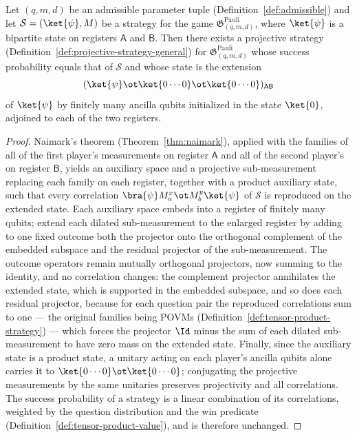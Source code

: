 \begin{lemma}
	\label{lem:projective-strategy-setup}
	\leanok
	Let $(q,m,d)$ be an admissible parameter tuple
	(Definition~\ref{def:admissible}) and let
	$\mathcal{S} = (\ket{\psi}, M)$ be a strategy for the game
	$\mathfrak{G}^{\mathrm{Pauli}}_{(q,m,d)}$, where $\ket{\psi}$ is a
	bipartite state on registers $\mathsf{A}$ and $\mathsf{B}$. Then there
	exists a projective strategy
	(Definition~\ref{def:projective-strategy-general}) for
	$\mathfrak{G}^{\mathrm{Pauli}}_{(q,m,d)}$ whose success probability
	equals that of $\mathcal{S}$ and whose state is the extension
	\[
		(\ket{\psi} \ot \ket{0\cdots 0} \ot \ket{0\cdots 0})_{\mathsf{A}\mathsf{B}}
	\]
	of $\ket{\psi}$ by finitely many ancilla qubits initialized in the
	state $\ket{0}$, adjoined to each of the two registers.
\end{lemma}
\begin{proof}
	\leanok
	Naimark's theorem (Theorem~\ref{thm:naimark}), applied with the
	families of all of the first player's measurements on register
	$\mathsf{A}$ and all of the second player's on register $\mathsf{B}$,
	yields an auxiliary space and a projective sub-measurement replacing
	each family on each register, together with a product auxiliary state,
	such that every correlation
	$\bra{\psi} M^{x}_a \ot M^{y}_b \ket{\psi}$ of $\mathcal{S}$ is
	reproduced on the extended state. Each auxiliary space embeds into a
	register of finitely many qubits; extend each dilated sub-measurement
	to the enlarged register by adding to one fixed outcome both the
	projector onto the orthogonal complement of the embedded subspace and
	the residual projector of the sub-measurement. The outcome operators
	remain mutually orthogonal projectors, now summing to the identity,
	and no correlation changes: the complement projector annihilates the
	extended state, which is supported in the embedded subspace, and so
	does each residual projector, because for each question pair the
	reproduced correlations sum to one --- the original families being
	POVMs (Definition~\ref{def:tensor-product-strategy}) --- which forces
	the projector $\Id$ minus the sum of each dilated sub-measurement to
	have zero mass on the extended state. Finally, since the auxiliary
	state is a product state, a unitary acting on each player's ancilla
	qubits alone carries it to $\ket{0 \cdots 0} \ot \ket{0 \cdots 0}$;
	conjugating the projective measurements by the same unitaries
	preserves projectivity and all correlations. The success probability
	of a strategy is a linear combination of its correlations, weighted by
	the question distribution and the win predicate
	(Definition~\ref{def:tensor-product-value}), and is therefore
	unchanged.
\end{proof}

